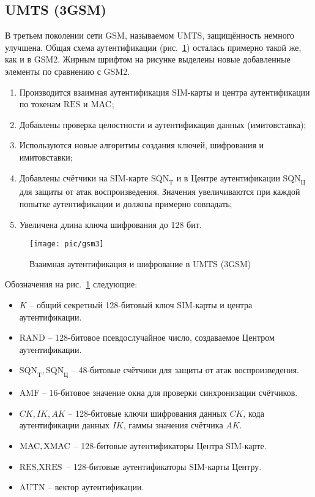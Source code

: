 \subsection{UMTS (3GSM)}

В третьем поколении сети GSM, называемом UMTS, защищённость немного улучшена. Общая схема аутентификации (рис.~\ref{fig:gsm3}) осталась примерно такой же, как и в GSM2. Жирным шрифтом на рисунке выделены новые добавленные элементы по сравнению с GSM2.
\begin{enumerate}
    \item Производится взаимная аутентификация SIM-карты и центра аутентификации по токенам $\textrm{RES}$ и $\textrm{MAC}$;
    \item Добавлены проверка целостности и аутентификация данных (имитовставка);
    \item Используются новые алгоритмы создания ключей, шифрования и имитовставки;
    \item Добавлены счётчики на SIM-карте $\textrm{SQN}_\textrm{T}$ и в Центре аутентификации $\textrm{SQN}_\textrm{Ц}$ для защиты от атак воспроизведения. Значения увеличиваются при каждой попытке аутентификации и должны примерно совпадать;
    \item Увеличена длина ключа шифрования до 128 бит.
\end{enumerate}

\begin{figure}[!ht]
	\centering
	\texttt{[image: pic/gsm3]}
	\caption{Взаимная аутентификация и шифрование в UMTS (3GSM)\label{fig:gsm3}}
\end{figure}

Обозначения на рис.~\ref{fig:gsm3} следующие:
\begin{itemize}
    \item $K$ -- общий секретный 128-битовый ключ SIM-карты и центра аутентификации.
    \item $\textrm{RAND}$ -- 128-битовое псевдослучайное число, создаваемое Центром аутентификации.
    \item $\textrm{SQN}_\textrm{T}, \textrm{SQN}_\textrm{Ц}$ -- 48-битовые счётчики для защиты от атак воспроизведения.
    \item $\textrm{AMF}$ -- 16-битовое значение окна для проверки синхронизации счётчиков.
    \item $CK, IK, AK$ -- 128-битовые ключи шифрования данных $CK$, кода аутентификации данных $IK$, гаммы значения счётчика $AK$.
    \item $\textrm{MAC}, \textrm{XMAC}$ -- 128-битовые аутентификаторы Центра SIM-карте.
    \item $\textrm{RES}, \textrm{XRES}$ -- 128-битовые аутентификаторы SIM-карты Центру.
    \item $\textrm{AUTN}$ -- вектор аутентификации.
\end{itemize}

